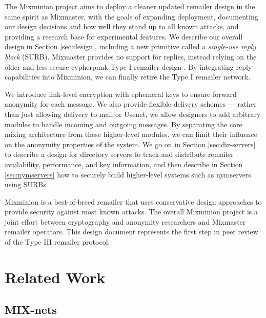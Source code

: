 \documentclass{llncs}
\begin{document}
The Mixminion project aims to deploy a cleaner updated remailer design
in the same spirit as Mixmaster, with the goals of expanding deployment,
documenting our design decisions and how well they stand up to all known
attacks, and providing a research base for experimental features. We
describe our overall design in Section \ref{sec:design}, including
a new primitive called a \emph{single-use reply block}
(SURB).  Mixmaster provides no support for replies, instead relying
on the older and less secure cypherpunk Type I remailer design
\cite{remailer-history}. By integrating reply capabilities into
Mixminion, we can finally retire the Type I remailer network.

We introduce link-level encryption with ephemeral keys to ensure forward
anonymity for each message. We also provide flexible delivery schemes ---
rather than just allowing delivery to mail or Usenet, we allow designers
to add arbitrary modules to handle incoming and outgoing messages. By
separating the core mixing architecture from these higher-level modules,
we can limit their influence on the anonymity properties of the system. We
go on in Section \ref{sec:dir-servers} to describe a design for directory
servers to track and distribute remailer availability, performance,
and key information, and then describe in Section \ref{sec:nymservers}
how to securely build higher-level systems such as nymservers using SURBs.

Mixminion is a best-of-breed remailer that uses conservative design
approaches to provide security against most known attacks. The overall
Mixminion project is a joint effort between cryptography and anonymity
researchers and Mixmaster remailer operators. This design document
represents the first step in peer review of the Type III remailer
protocol.


\section{Related Work}

\subsection{MIX-nets}
\end{document}
